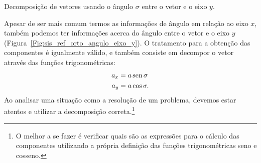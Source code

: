 \begin{marginfigure}[-1cm]
\centering
{}
\caption{Decomposição de vetores usando o ângulo $\sigma$ entre o vetor e o eixo $y$.\label{Fig:sis_ref_orto_angulo_eixo_y}}
\end{marginfigure}

Apesar de ser mais comum termos as informações de ângulo em relação ao eixo $x$, também podemos ter informações acerca do ângulo entre o vetor e o eixo $y$ (Figura~\ref{Fig:sis_ref_orto_angulo_eixo_y}). O tratamento para a obtenção das componentes é igualmente válido, e também consiste em decompor o vetor através das funções trigonométricas:
\begin{align}
    a_x &= a\operatorname{sen}\sigma \\
    a_y &= a\cos\sigma.
\end{align}
%
Ao analisar uma situação como a resolução de um problema, devemos estar atentos e utilizar a decomposição correta.\footnote[][-2.5cm]{O melhor a se fazer é verificar quais são as expressões para o cálculo das componentes utilizando a própria definição das funções trigonométricas seno e cosseno.}


